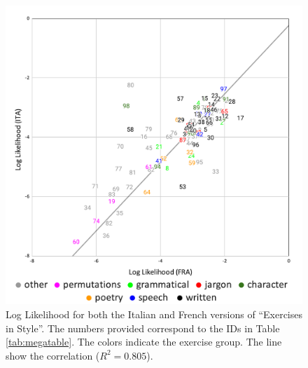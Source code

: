 \documentclass[
twocolumn,
]{ceurart}
\begin{document}
\begin{figure}[t]
    \includegraphics[trim=0.5cm 0cm 0.5cm 0.5cm, clip, width=\columnwidth]{LL-trend.pdf}
    \centering
    \caption{Log Likelihood for both the Italian and French versions of ``Exercises in Style''. The numbers provided correspond to the IDs in Table \ref{tab:megatable}. The colors indicate the exercise group. The line show the correlation ($R^2=0.805$).}
    \label{fig:ll_corr_ita_fra}
\end{figure}
\end{document}
